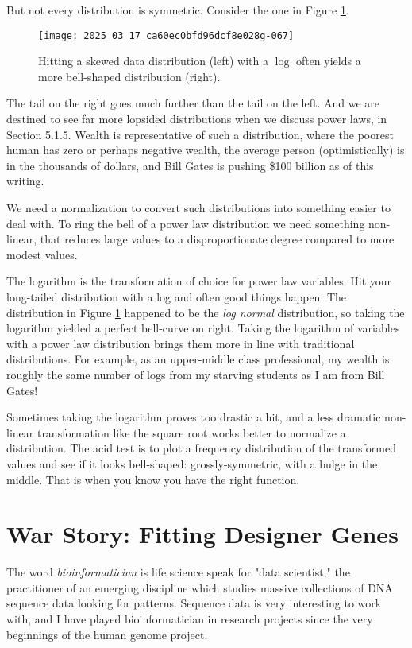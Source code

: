 \documentclass[10pt]{article}
\begin{document}
But not every distribution is symmetric. Consider the one in Figure \ref{figure:skewed_distribution_left}.
\begin{figure}[h]
    \centering
    \texttt{[image: 2025\_03\_17\_ca60ec0bfd96dcf8e028g-067]}
    \caption{Hitting a skewed data distribution (left) with a $\log$ often yields a more bell-shaped distribution (right).}
    \label{figure:skewed_distribution_left}
\end{figure}

The tail on the right goes much further than the tail on the left. And we are destined to see far more lopsided distributions when we discuss power laws, in Section 5.1.5. Wealth is representative of such a distribution, where the poorest human has zero or perhaps negative wealth, the average person (optimistically) is in the thousands of dollars, and Bill Gates is pushing \$100 billion as of this writing.

We need a normalization to convert such distributions into something easier to deal with. To ring the bell of a power law distribution we need something non-linear, that reduces large values to a disproportionate degree compared to more modest values.

The logarithm is the transformation of choice for power law variables. Hit your long-tailed distribution with a log and often good things happen. The distribution in Figure \ref{figure:skewed_distribution_left} happened to be the \textit{log normal} distribution, so taking the logarithm yielded a perfect bell-curve on right. Taking the logarithm of variables with a power law distribution brings them more in line with traditional distributions. For example, as an upper-middle class professional, my wealth is roughly the same number of logs from my starving students as I am from Bill Gates!

Sometimes taking the logarithm proves too drastic a hit, and a less dramatic non-linear transformation like the square root works better to normalize a distribution. The acid test is to plot a frequency distribution of the transformed values and see if it looks bell-shaped: grossly-symmetric, with a bulge in the middle. That is when you know you have the right function.

\section{War Story: Fitting Designer Genes}
The word \textit{bioinformatician} is life science speak for "data scientist," the practitioner of an emerging discipline which studies massive collections of DNA sequence data looking for patterns. Sequence data is very interesting to work with, and I have played bioinformatician in research projects since the very beginnings of the human genome project.
\end{document}
